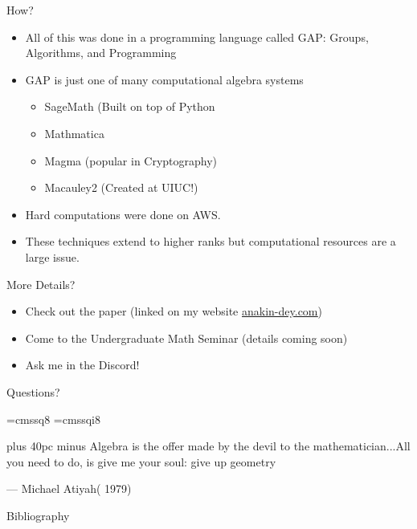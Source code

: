 \documentclass[aspectratio=169]{beamer}
\begin{document}
\begin{frame}{How?}
    \begin{itemize}
        \item All of this was done in a programming language called \textcolor{sigma@mainblue}{\textsc{GAP}}: Groups, Algorithms, and Programming \pause
        \item \textsc{GAP} is just one of many computational algebra systems
        \begin{itemize}
            \item SageMath (Built on top of Python
            \item Mathmatica
            \item Magma (popular in Cryptography)
            \item Macauley2 (Created at UIUC!)
        \end{itemize} \pause
        \item Hard computations were done on AWS.
        \item These techniques extend to higher ranks but computational resources are a large issue.
    \end{itemize}
\end{frame}

\begin{frame}{More Details?}
    \begin{itemize}
        \item Check out the paper (linked on my website \href{https://www.anakin-dey.com/}{\ul{anakin-dey.com}})
        \item Come to the Undergraduate Math Seminar (details coming soon)
        \item Ask me in the Discord!
    \end{itemize}
\end{frame}

\begin{frame}{}
      \begin{center}
    {\color{sigma@mainblue} \LARGE Questions?}
  \end{center}
\end{frame}

\font\eightss=cmssq8
\font\eightssi=cmssqi8
\newcommand\quoteAuthorDate[3]{\begingroup
  \baselineskip 10pt
  \parfillskip 0pt
  \interlinepenalty 10000 %
  \leftskip 0pt plus 40pc minus \parindent
  \let\rm=\eightss
  \let\sl=\eightssi
  \everypar{\sl}#1\par
  \nobreak\smallskip
  \noindent\rm--- #2\unskip\enspace(#3)\par
  \endgroup}
\begin{frame}
    \begin{center}
        \item \quoteAuthorDate{Algebra is the offer made by the devil to the mathematician...All you need to do, is give me your soul: give up geometry}{Michael Atiyah}{\color{sigma@mainblue} 1979}
    \end{center}
\end{frame}

\begin{frame}{Bibliography}
    
    
\end{frame}
\end{document}

